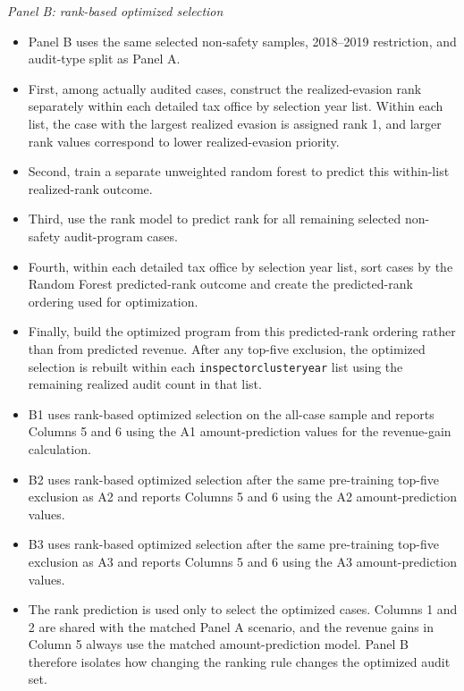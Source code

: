 \documentclass{article}
\begin{document}
\noindent\textit{Panel B: rank-based optimized selection}
\begin{itemize}
\item Panel B uses the same selected non-safety samples, 2018--2019 restriction, and audit-type split as Panel A.
\item First, among actually audited cases, construct the realized-evasion rank separately within each detailed tax office by selection year list. Within each list, the case with the largest realized evasion is assigned rank 1, and larger rank values correspond to lower realized-evasion priority.
\item Second, train a separate unweighted random forest to predict this within-list realized-rank outcome.
\item Third, use the rank model to predict rank for all remaining selected non-safety audit-program cases.
\item Fourth, within each detailed tax office by selection year list, sort cases by the Random Forest predicted-rank outcome and create the predicted-rank ordering used for optimization.
\item Finally, build the optimized program from this predicted-rank ordering rather than from predicted revenue. After any top-five exclusion, the optimized selection is rebuilt within each \texttt{inspectorclusteryear} list using the remaining realized audit count in that list.
\item B1 uses rank-based optimized selection on the all-case sample and reports Columns 5 and 6 using the A1 amount-prediction values for the revenue-gain calculation.
\item B2 uses rank-based optimized selection after the same pre-training top-five exclusion as A2 and reports Columns 5 and 6 using the A2 amount-prediction values.
\item B3 uses rank-based optimized selection after the same pre-training top-five exclusion as A3 and reports Columns 5 and 6 using the A3 amount-prediction values.
\item The rank prediction is used only to select the optimized cases. Columns 1 and 2 are shared with the matched Panel A scenario, and the revenue gains in Column 5 always use the matched amount-prediction model. Panel B therefore isolates how changing the ranking rule changes the optimized audit set.
\end{itemize}
\end{document}
